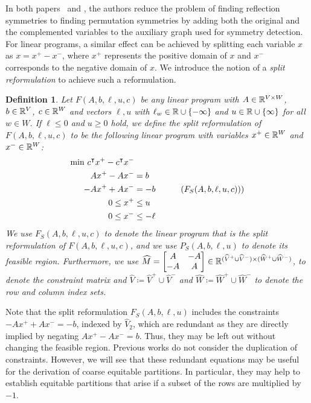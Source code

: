 \documentclass[pdflatex,sn-mathphys-num]{sn-jnl}%
\theoremstyle{thmstyleone}%
\newtheorem{definition}{Definition}
\theoremstyle{thmstylethree}%
\theoremstyle{thmstyletwo}%
\begin{document}
In both papers~\cite{Hojny2025-si} and \cite{Christophel2014}, the authors reduce the problem of finding reflection symmetries to finding permutation symmetries by adding both the original and the complemented variables to the auxiliary graph used for symmetry detection. For linear programs, a similar effect can be achieved by splitting each variable $x$ as $x=x^+ - x^-$, where $x^+$ represents the positive domain of $x$ and $x^-$ corresponds to the negative domain of $x$. We introduce the notion of a \emph{split reformulation} to achieve such a reformulation.
\begin{definition}
    \label{def_split_reform}
    Let $F(A,b,\ell,u,c)$ be any linear program with $A\in \mathbb{R}^{V\times W}$, $b\in \mathbb{R}^V$, $c\in \mathbb{R}^W$ and vectors $\ell,u$ with $\ell_w\in \mathbb{R}\cup \{-\infty\}$ and $u \in \mathbb{R}\cup \{\infty\}$ for all $w\in W$. 
    If $\ell \leq 0$ and $u \geq 0$ hold, we define the \emph{split reformulation} of $F(A,b,\ell,u,c)$ to be the following linear program with variables $x^+\in \mathbb{R}^W$ and $x^-\in \mathbb{R}^W$:
    \begin{equation}
        \begin{split}
            \min\,  c^{\intercal} x^+ - c^{\intercal} x^-\\
            A x^+ - A x^- &= b\\
            -A x^+ + A x^- &= -b\\
            0\leq x^+ &\leq u \\
            0 \leq x^- &\leq -\ell
        \end{split}
        \tag{$F_S(A,b,\ell,u,c))$}
    \end{equation}
    We use $F_S(A,b,\ell,u,c)$ to denote the linear program that is the split reformulation of $F(A,b,\ell,u,c)$, and we use $P_S(A,b,\ell,u)$ to denote its feasible region. 
    Furthermore, we use $\widehat{M} = \begin{bmatrix}
        A & -A\\
        -A & A
    \end{bmatrix}\in \mathbb{R}^{(\widehat{V}^+ \cup \widehat{V}^-) \times (\widehat{W}^+ \cup \widehat{W}^-)}$, to denote the constraint matrix and $\widehat{V} \coloneqq \widehat{V}^+ \cup \widehat{V}^-$ and $\widehat{W} \coloneqq \widehat{W}^+ \cup \widehat{W}^-$ to denote the row and column index sets.
\end{definition}

Note that the split reformulation  $F_S(A,b,\ell,u)$ includes the constraints $-Ax^+ + A x^- = -b$, indexed by $\widehat{V}_2$, which are redundant as they are directly implied by negating $Ax^+ - Ax^- = b$. Thus, they may be left out without changing the feasible region. Previous works do not consider the duplication of constraints. However, we will see that these redundant equations may be useful for the derivation of coarse equitable partitions. In particular, they may help to establish equitable partitions that arise if a subset of the rows are multiplied by $-1$.\\
\end{document}
